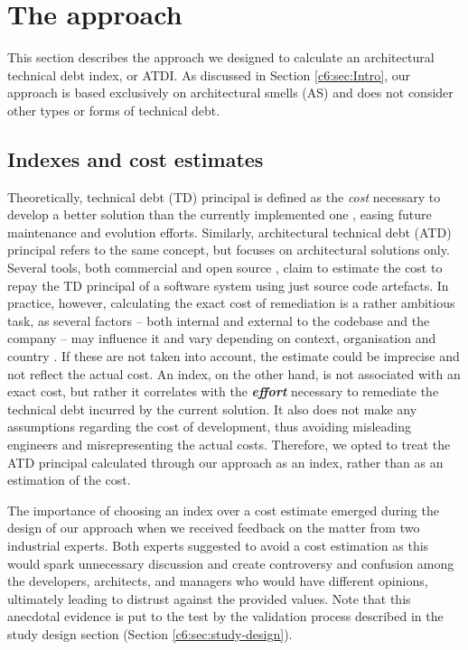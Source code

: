 \section{The approach}\label{c6:sec:approach}
This section describes the approach we designed to calculate an architectural technical debt index, or ATDI.
As discussed in Section \ref{c6:sec:Intro}, our approach is based exclusively on architectural smells (AS) and does not consider other types or forms of technical debt. 

\subsection{Indexes and cost estimates}
Theoretically, technical debt (TD) principal is defined as the \emph{cost} necessary to develop a better solution than the currently implemented one \cite{Avgeriou2016}, easing future maintenance and evolution efforts.
Similarly, architectural technical debt (ATD) principal refers to the same concept, but focuses on architectural solutions only.
Several tools, both commercial and open source \cite{Avgeriou2021,Khomyakov2020}, claim to estimate the cost to repay the TD principal of a software system using just source code artefacts.
In practice, however, calculating the exact cost of remediation is a rather ambitious task, as several factors -- both internal and external to the codebase and the company -- may influence it and vary depending on context, organisation and country \cite{Murillo2021,Rios2020,Rios2018}.
If these are not taken into account, the estimate could be imprecise and not reflect the actual cost. 
An index, on the other hand, is not associated with an exact cost, but rather it correlates with the \textbf{\emph{effort}} necessary to remediate the technical debt incurred by the current solution.
It also does not make any assumptions regarding the cost of development, thus avoiding misleading engineers and misrepresenting the actual costs.
Therefore, we opted to treat the ATD principal calculated through our approach as an index, rather than as an estimation of the cost. 

The importance of choosing an index over a cost estimate emerged during the design of our approach when we received feedback on the matter from two industrial experts. 
Both experts suggested to avoid a cost estimation as this would spark unnecessary discussion and create controversy and confusion among the developers, architects, and managers who would have different opinions, ultimately leading to distrust against the provided values.
Note that this anecdotal evidence is put to the test by the validation process described in the study design section (Section \ref{c6:sec:study-design}).

